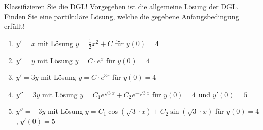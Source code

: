 \item Klassifizieren Sie die DGL! Vorgegeben ist die allgemeine Lösung der DGL. Finden Sie eine partikuläre Lösung, welche die gegebene Anfangsbedingung erfüllt!

\begin{enumerate}
\item{$y' = x$ mit Lösung $y=\frac{1}{2}x^2+C$ für $y(0)=4$}
\item{$y' = y$ mit Lösung $y=C\cdot e^x$ für $y(0)=4$}
\item{$y' = 3y$ mit Lösung $y=C \cdot e^{3x}$ für $y(0)=4$ }
\item{$y'' = 3y$ mit Lösung $y=C_1 e^{\sqrt{3}x} + C_2 e^{-\sqrt{3}x}$ für $y(0)=4$ und $y'(0)=5$}
\item{$y'' = -3y$ mit Lösung $y=C_1 \cos(\sqrt{3}\cdot x) + C_2 \sin(\sqrt{3}\cdot x)$ für $y(0)=4$, $y'(0)=5$}
\end{enumerate}

